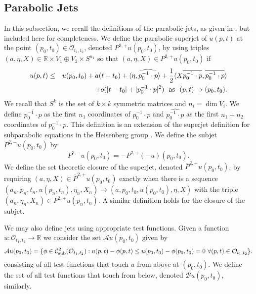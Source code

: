 \documentclass[12pt]{amsart}
\theoremstyle{definition}
\theoremstyle{remark}
\numberwithin{equation}{section}
\begin{document}
\subsection{Parabolic Jets}
In this subsection, we recall the definitions of the parabolic jets, as given in \cite{BM}, but included here for completeness.  We define the parabolic superjet of $u(p,t)$ at the point $(p_0,t_0) \in \mathcal{O}_{t_1,t_2}$, denoted $P^{2,+}u(p_0,t_0)$, by using triples $(a,\eta,X) \in \mathbb{R} \times V_1\oplus V_2 \times S^{n_1}$ so that $(a,\eta,X) \in P^{2,+}u(p_0,t_0)$ if 
\begin{eqnarray*}
u(p,t) & \leq & u(p_0,t_0) + a(t-t_0) + {\ensuremath{\langle {\eta} , {\widehat{p_0^{-1}\cdot p}} \rangle}}+\frac{1}{2}{\ensuremath{\langle {X\overline{p_0^{-1}\cdot p}} , {\overline{p_0^{-1}\cdot p}} \rangle}}\\
 & & + o(|t-t_0|+|p_0^{-1}\cdot p|^2)\ \ \textmd{as}\ \ (p,t)\rightarrow (p_0,t_0).
\end{eqnarray*}
We recall that $S^k$ is the set of $k\times k$ symmetric matrices and $n_i=\dim V_i$. We define $\overline{p_0^{-1}\cdot p}$ as the first $n_1$ coordinates of 
$p_0^{-1}\cdot p$ and $\widehat{p_0^{-1}\cdot p}$ as the first $n_1+n_2$ coordinates of 
$p_0^{-1}\cdot p$.  
This definition is an extension of the superjet definition for subparabolic equations in the Heisenberg group \cite{B:HP}.  We define the subjet $P^{2,-}u(p_0,t_0)$ by 
$$P^{2,-}u(p_0,t_0)=-P^{2,+}(-u)(p_0,t_0).$$  
We define the set theoretic closure of the superjet, denoted $\overline{P}^{2,+}u(p_0,t_0)$, by requiring $(a,\eta,X) \in \overline{P}^{2,+}u(p_0,t_0)$ exactly when there is a sequence \\
$(a_n,p_n,t_n,u(p_n,t_n),\eta_n,X_n)\to (a,p_0,t_0,u(p_0,t_0),\eta,X)$ with the triple \\ $(a_n,\eta_n,X_n)\in P^{2,+}u(p_n,t_n)$. A similar definition holds for the closure of the subjet.

We may also define jets using appropriate test functions. Given a function $u:\mathcal{O}_{t_1,t_2}\to \mathbb{R}$
we consider the set $\mathcal{A}u(p_0,t_0)$ given by
\begin{equation*}
\mathcal{A}u(p_0,t_0) = \{\phi \in {\operatorname{\mathcal{C}^2_{\textmd{sub}}}}(\mathcal{O}_{t_1,t_2}):u(p,t)-\phi(p,t)\leq u(p_0,t_0)-\phi(p_0,t_0)=0\  \forall (p,t)\in \mathcal{O}_{t_1,t_2}\}.
\end{equation*}
consisting of all test functions that touch $u$ from above at $(p_0,t_0)$. We define 
the set of all test functions that touch from below, denoted $\mathcal{B}u(p_0,t_0)$,
similarly.
\end{document}
